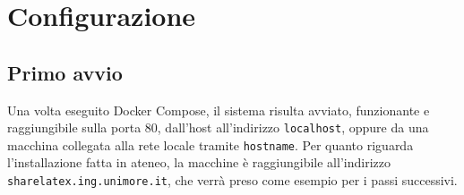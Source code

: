 \chapter{Configurazione}
\label{Configurazione}
\thispagestyle{empty}

\section{Primo avvio}
Una volta eseguito Docker Compose, il sistema risulta avviato, funzionante e raggiungibile sulla porta 80, dall'host all'indirizzo \verb|localhost|, oppure da una macchina collegata alla rete locale tramite \verb|hostname|. Per quanto riguarda l'installazione fatta in ateneo, la macchine è raggiungibile all'indirizzo \verb|sharelatex.ing.unimore.it|, che verrà preso come esempio per i passi successivi.

